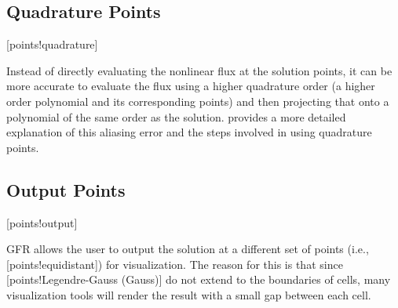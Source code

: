 

\subsection{Quadrature Points}
\label{SEC:Intro:Quadrature_Points}
\key*{}[points!quadrature]


Instead of directly evaluating the nonlinear flux at the solution points,
it can be more accurate to evaluate the flux using a higher quadrature order
(\thatis a higher order polynomial and its corresponding points)
and then projecting that onto a polynomial of the same order as the solution.
%
 provides a more detailed explanation of this
aliasing error and the steps involved in using quadrature points.


\subsection{Output Points}
\label{SEC:Intro:Output_Points}
\key*{}[points!output]


GFR allows the user to output the solution at a different set of points
(i.e., [points!equidistant]) for visualization.
%
The reason for this is that since
[points!Legendre-Gauss (Gauss)] do not extend to the
boundaries of cells, many visualization tools will render the result
with a small gap between each cell.

